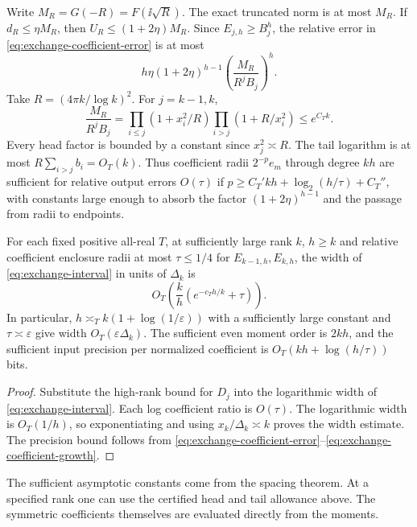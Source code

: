Write \(M_R=G(-R)=F(\ii\sqrt R)\). The exact truncated norm is
at most \(M_R\). If \(d_R\le\eta M_R\), then
\(U_R\le(1+2\eta)M_R\). Since \(E_{j,h}\ge B_j^h\),
the relative error in \eqref{eq:exchange-coefficient-error} is at most
\[
 h\eta(1+2\eta)^{h-1}
 \left(\frac{M_R}{R^j B_j}\right)^h.
\]
Take \(R=(4\pi k/\log k)^2\). For \(j=k-1,k\),
\begin{equation}\label{eq:exchange-coefficient-growth}
 \frac{M_R}{R^j B_j}
 =\prod_{i\le j}(1+x_i^2/R)\prod_{i>j}(1+R/x_i^2)
 \le e^{C_T k}.
\end{equation}
Every head factor is bounded by a constant since \(x_j^2\asymp R\).
The tail logarithm is at most \(R\sum_{i>j}b_i=O_T(k)\).
Thus coefficient radii \(2^{-p} e_m\) through degree \(kh\)
are sufficient for relative output errors \(O(\tau)\) if
\(p\ge C_T'kh+\log_2(h/\tau)+C_T''\), with constants large enough
to absorb the factor \((1+2\eta)^{h-1}\) and the passage from
radii to endpoints.

\begin{theorem}\label{thm:high-rank-exchange}
For each fixed positive all-real \(T\), at sufficiently large rank
\(k\), \(h\ge k\) and relative coefficient enclosure radii at most
\(\tau\le1/4\) for \(E_{k-1,h},E_{k,h}\), the width of
\eqref{eq:exchange-interval} in units of \(\Delta_k\) is
\[
 O_T\!\left(\frac{k}{h}(e^{-c_T h/k}+\tau)\right).
\]
In particular, \(h\asymp_T k(1+\log(1/\varepsilon))\) with a
sufficiently large constant and \(\tau\asymp\varepsilon\)
give width \(O_T(\varepsilon\Delta_k)\). The sufficient even
moment order is \(2kh\), and the sufficient input precision per
normalized coefficient is \(O_T(kh+\log(h/\tau))\) bits.
\end{theorem}
\begin{proof}
Substitute the high-rank bound for \(D_j\) into the logarithmic
width of \eqref{eq:exchange-interval}. Each log coefficient
ratio is \(O(\tau)\). The logarithmic width is \(O_T(1/h)\),
so exponentiating and using \(x_k/\Delta_k\asymp k\) proves
the width estimate. The precision bound follows from
\eqref{eq:exchange-coefficient-error}--\eqref{eq:exchange-coefficient-growth}.
\end{proof}
The sufficient asymptotic constants come from the spacing theorem.
At a specified rank one can use the certified head and tail
allowance above. The symmetric coefficients themselves are evaluated
directly from the moments.
